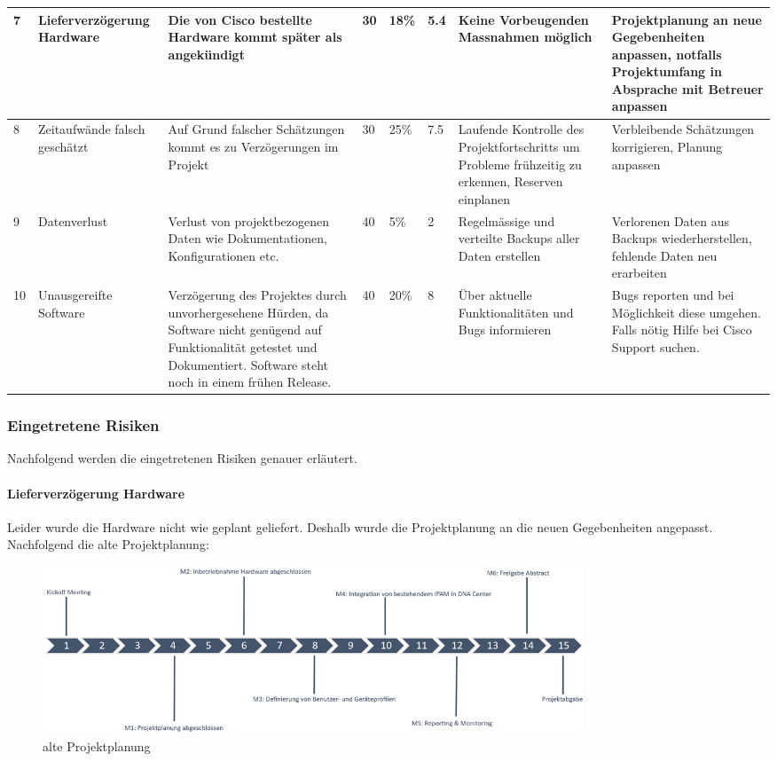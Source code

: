 \begin{landscape}
\begin{longtable}{|m{0.5cm}|m{3cm}|m{5cm}|m{0.75cm}|m{0.75cm}|m{0.75cm}|m{5cm}|m{5cm}|}
	\hline
	7 & Lieferverzögerung Hardware & Die von Cisco bestellte Hardware kommt später als angekündigt & 30 & 18\% & 5.4 & Keine Vorbeugenden Massnahmen möglich & Projektplanung an neue Gegebenheiten anpassen, notfalls Projektumfang in Absprache mit Betreuer anpassen \\
	\hline
	8 & Zeitaufwände falsch geschätzt & Auf Grund falscher Schätzungen kommt es zu Verzögerungen im Projekt & 30 & 25\% & 7.5 & Laufende Kontrolle des Projektfortschritts um Probleme frühzeitig zu erkennen, Reserven einplanen & Verbleibende Schätzungen korrigieren, Planung anpassen \\
	\hline
	9 & Datenverlust & Verlust von projektbezogenen Daten wie Dokumentationen, Konfigurationen etc. & 40 & 5\% & 2 & Regelmässige und verteilte Backups aller Daten erstellen & Verlorenen Daten aus Backups wiederherstellen, fehlende Daten neu erarbeiten \\
	\hline
	10 & Unausgereifte Software & Verzögerung des Projektes durch unvorhergesehene Hürden, da Software nicht genügend auf Funktionalität getestet und Dokumentiert. Software steht noch in einem frühen Release. & 40 & 20\% & 8 & Über aktuelle Funktionalitäten und Bugs informieren & Bugs reporten und bei Möglichkeit diese umgehen. Falls nötig Hilfe bei Cisco Support suchen. \\
	\hline
\end{longtable}

\end{landscape}



\subsubsection{Eingetretene Risiken}
Nachfolgend werden die eingetretenen Risiken genauer erläutert.
\paragraph{Lieferverzögerung Hardware}
Leider wurde die Hardware nicht wie geplant geliefert. Deshalb wurde die Projektplanung an die neuen Gegebenheiten angepasst. \\
Nachfolgend die alte Projektplanung:
\begin{figure}[H]
	\centering
	\includegraphics[height=5cm]{img/ZeitlichePlanung_v1.png}
	\caption{alte Projektplanung}
	\label{fig:alte Projektplanung}
\end{figure} 

